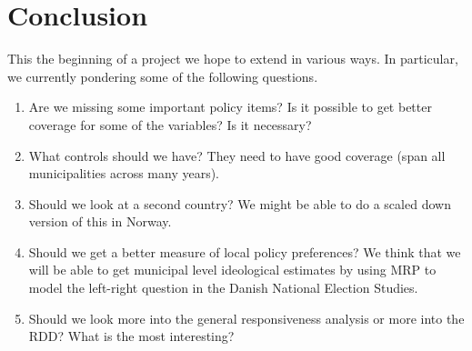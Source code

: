 \documentclass[a4paper,12pt]{article}
\newcommand{\beginsupplement}{%
	\setcounter{table}{0}
	\renewcommand{\thetable}{S.\arabic{table}}%
	\setcounter{figure}{0}
	\renewcommand{\thefigure}{S.\arabic{figure}}%
}
\begin{document}
\section{Conclusion}
This the beginning of a project we hope to extend in various ways. In particular, we currently pondering some of the following questions.
\begin{enumerate}
	\item Are we missing some important policy items? Is it possible to get better coverage for some of the variables? Is it necessary?
	\item  What controls should we have? They need to have good coverage (span all municipalities across many years).
	\item Should we look at a second country? We might be able to do a scaled down version of this in Norway. 
	\item Should we get a better measure of local policy preferences? We think that we will be able to get municipal level ideological estimates by using MRP to model the left-right question in the Danish National Election Studies.
	\item Should we look more into the general responsiveness analysis or more into the RDD? What is the most interesting?
\end{enumerate}








	
\end{document}
